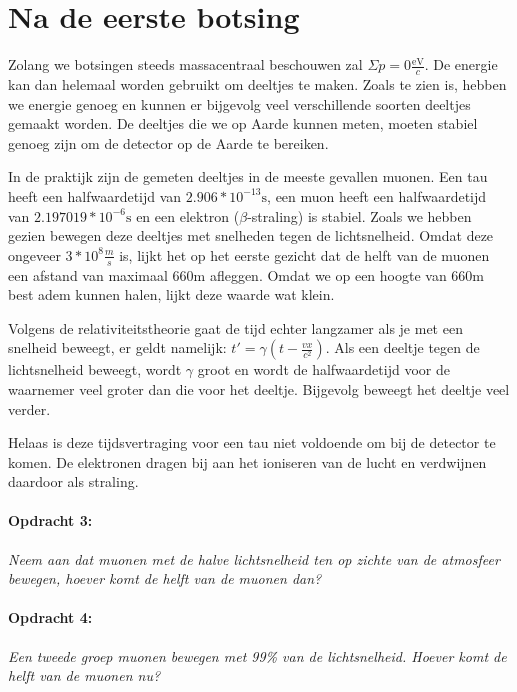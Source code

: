 \section{Na de eerste botsing}

Zolang we botsingen steeds massacentraal beschouwen zal $\Sigma p=0\frac{\mathrm{eV}}{c}$.
De energie kan dan helemaal worden gebruikt om deeltjes te maken.
Zoals te zien is, hebben we energie genoeg en kunnen er bijgevolg
veel verschillende soorten deeltjes gemaakt worden. De deeltjes die
we op Aarde kunnen meten, moeten stabiel genoeg zijn om de detector
op de Aarde te bereiken.

In de praktijk zijn de gemeten deeltjes in de meeste gevallen muonen.
Een tau heeft een halfwaardetijd van $2.906*10^{-13}\mathrm{s}$,
een muon heeft een halfwaardetijd van $2.197019*10^{-6}\mathrm{s}$
en een elektron ($\beta$-straling) is stabiel. Zoals we hebben gezien
bewegen deze deeltjes met snelheden tegen de lichtsnelheid. Omdat
deze ongeveer $3*10^{8}\frac{m}{s}$ is, lijkt het op het eerste gezicht
dat de helft van de muonen een afstand van maximaal 660m afleggen.
Omdat we op een hoogte van 660m best adem kunnen halen, lijkt deze
waarde wat klein.

Volgens de relativiteitstheorie gaat de tijd echter langzamer als
je met een snelheid beweegt, er geldt namelijk: $t'=\gamma\left(t-\frac{vx}{c^{2}}\right)$.
Als een deeltje tegen de lichtsnelheid beweegt, wordt $\gamma$ groot
en wordt de halfwaardetijd voor de waarnemer veel groter dan die voor
het deeltje. Bijgevolg beweegt het deeltje veel verder.

Helaas is deze tijdsvertraging voor een tau niet voldoende om bij
de detector te komen. De elektronen dragen bij aan het ioniseren van
de lucht en verdwijnen daardoor als straling. 


\paragraph*{Opdracht 3:}

\emph{Neem aan dat muonen met de halve lichtsnelheid ten op zichte
van de atmosfeer bewegen, hoever komt de helft van de muonen dan?}


\paragraph*{Opdracht 4:}

\emph{Een tweede groep muonen bewegen met 99\% van de lichtsnelheid.
Hoever komt de helft van de muonen nu?}


